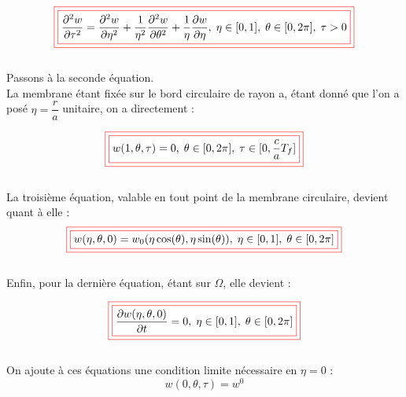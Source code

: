 \documentclass[a4,12pt]{article}
\newcommand{\redbox}[1]{\fcolorbox{red}{white}{\fcolorbox{red}{white}{$\displaystyle#1$}}}
\begin{document}
\begin{itemize}
			      \[\redbox{
				\dfrac{\partial^2 w}{\partial \tau^2} = \dfrac{\partial^2 w}{\partial \eta^2}+\dfrac{1}{\eta^2}\dfrac{\partial^2 w}{\partial \theta^2}+\dfrac{1}{\eta}\dfrac{\partial w}{\partial \eta},\;\eta\in[0,1],\;\theta\in[0,2\pi],\;\tau>0
			      }\]
			      ~\\

			      Passons à la seconde équation.\\

			      La membrane étant fixée sur le bord circulaire de rayon a, étant donné que l'on a posé $\eta=\dfrac{r}{a}$ unitaire, on a directement :

			      \[\redbox{
				w(1,\theta,\tau) = 0,\;\theta\in[0,2\pi],\;\tau\in[0,\frac{c}{a}T_f]
			      }\]
			      ~\\
			      La troisième équation, valable en tout point de la membrane circulaire, devient quant à elle :\\
			      \[\redbox{
				w(\eta,\theta,0) = w_0(\eta \cos(\theta),\eta \sin (\theta)),\;\eta\in[0,1],\;\theta\in[0,2\pi]
			      }\]
			      ~\\

			      Enfin, pour la dernière équation, étant sur $\Omega$, elle devient :

			      \[\redbox{
				\dfrac{\partial w(\eta,\theta,0)}{\partial t} = 0,\;\eta\in[0,1],\;\theta\in[0,2\pi]
			      }\]
			      ~\\
			      On ajoute à ces équations une condition limite nécessaire  en $\eta=0$ :
			      \[
				w(0,\theta,\tau)=w^0
			      \]

			  \end{itemize}

\end{document}
